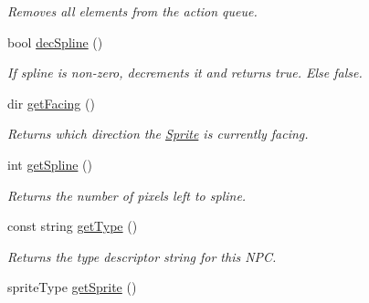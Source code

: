 \begin{DoxyCompactItemize}
\begin{DoxyCompactList}\small\item\em Removes all elements from the action queue. \end{DoxyCompactList}\item 
bool \hyperlink{class_sprite_af880e3cfcd03b6de68171eef82dc6a69}{dec\+Spline} ()\hypertarget{class_sprite_af880e3cfcd03b6de68171eef82dc6a69}{}\label{class_sprite_af880e3cfcd03b6de68171eef82dc6a69}

\begin{DoxyCompactList}\small\item\em If spline is non-\/zero, decrements it and returns true. Else false. \end{DoxyCompactList}\item 
dir \hyperlink{class_sprite_a6bf9e87449da385e99c02586eadf5de6}{get\+Facing} ()\hypertarget{class_sprite_a6bf9e87449da385e99c02586eadf5de6}{}\label{class_sprite_a6bf9e87449da385e99c02586eadf5de6}

\begin{DoxyCompactList}\small\item\em Returns which direction the \hyperlink{class_sprite}{Sprite} is currently facing. \end{DoxyCompactList}\item 
int \hyperlink{class_sprite_aad5e5beb45ec5eae6fe8d096d5ebef68}{get\+Spline} ()\hypertarget{class_sprite_aad5e5beb45ec5eae6fe8d096d5ebef68}{}\label{class_sprite_aad5e5beb45ec5eae6fe8d096d5ebef68}

\begin{DoxyCompactList}\small\item\em Returns the number of pixels left to spline. \end{DoxyCompactList}\item 
const string \hyperlink{class_sprite_a58c0213b779c1174473852a090efaa72}{get\+Type} ()\hypertarget{class_sprite_a58c0213b779c1174473852a090efaa72}{}\label{class_sprite_a58c0213b779c1174473852a090efaa72}

\begin{DoxyCompactList}\small\item\em Returns the type descriptor string for this N\+PC. \end{DoxyCompactList}\item 
sprite\+Type \hyperlink{class_sprite_a01742e39c9f18622a094a187d6858912}{get\+Sprite} ()\hypertarget{class_sprite_a01742e39c9f18622a094a187d6858912}{}\label{class_sprite_a01742e39c9f18622a094a187d6858912}


\end{DoxyCompactItemize}
